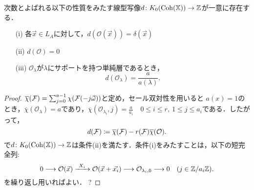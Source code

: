 \begin{prop}
	次数とよばれる以下の性質をみたす線型写像$d\colon K_0(\operatorname{\mathrm{Coh}}({\mathbb X}))\to {\mathbb Z}$が一意に存在する．
	\begin{itemize}
		\item[(i)]
			各$\vec{x}\in L_A$に対して，$d(\mathcal{O}(\vec{x})) = \delta(\vec{x})$
		\item[(ii)]
			$d(\mathcal{O}) = 0$
		\item[(iii)]
			$\mathcal{O}_{\lambda}$が$\lambda$にサポートを持つ単純層であるとき，
		\[ d(\mathcal{O}_{\lambda}) = \frac{a}{a(\lambda)}.\]
	\end{itemize}
\end{prop}
\begin{proof}
$\overline{\chi}({\mathcal F}) = \sum_{j=0}^{a-1}\chi({\mathcal F}(-j\vec{\omega}))$と定め，セール双対性を用いると
$a(x)=1$のとき，$\overline{\chi}(\mathcal{O}_\lambda) = a$であり，$\overline{\chi}(\mathcal{O}_{\lambda_i},j) = \frac{a}{a_i}\quad 0\le i \le r,\ 1\le j \le a_i$である．したがって，
\[d({\mathcal F}) \coloneq \overline{\chi}({\mathcal F}) - r({\mathcal F})\overline{\chi}(\mathcal{O}).\]
で$d\colon K_0(\operatorname{\mathrm{Coh}}({\mathbb X}))\to{\mathbb Z}$は条件(ii)を満たす．条件(i)をみたすことは，以下の短完全列:
\[0\longrightarrow \mathcal{O}(\vec{x})\xrightarrow{\ X_i\ }\mathcal{O}(\vec{x}+\vec{x_i})\longrightarrow \mathcal{O}_{\lambda_i,0}\longrightarrow 0\quad (j\in \ZZ/a_i\ZZ).\]
を繰り返し用いればよい．{\color{red} ?}
\end{proof}

